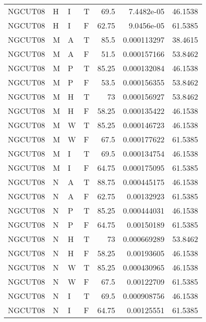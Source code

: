 \begin{longtable}{llllrrr}
    NGCUT08  & H     & I     & T          & 69.5       & 7.4482e-05  & 46.1538  \\
    NGCUT08  & H     & I     & F          & 62.75      & 9.0456e-05  & 61.5385  \\
    NGCUT08  & M     & A     & T          & 85.5       & 0.000113297 & 38.4615  \\
    NGCUT08  & M     & A     & F          & 51.5       & 0.000157166 & 53.8462  \\
    NGCUT08  & M     & P     & T          & 85.25      & 0.000132084 & 46.1538  \\
    NGCUT08  & M     & P     & F          & 53.5       & 0.000156355 & 53.8462  \\
    NGCUT08  & M     & H     & T          & 73         & 0.000156927 & 53.8462  \\
    NGCUT08  & M     & H     & F          & 58.25      & 0.000135422 & 46.1538  \\
    NGCUT08  & M     & W     & T          & 85.25      & 0.000146723 & 46.1538  \\
    NGCUT08  & M     & W     & F          & 67.5       & 0.000177622 & 61.5385  \\
    NGCUT08  & M     & I     & T          & 69.5       & 0.000134754 & 46.1538  \\
    NGCUT08  & M     & I     & F          & 64.75      & 0.000175095 & 61.5385  \\
    NGCUT08  & N     & A     & T          & 88.75      & 0.000445175 & 46.1538  \\
    NGCUT08  & N     & A     & F          & 62.75      & 0.00132923  & 61.5385  \\
    NGCUT08  & N     & P     & T          & 85.25      & 0.000444031 & 46.1538  \\
    NGCUT08  & N     & P     & F          & 64.75      & 0.00150189  & 61.5385  \\
    NGCUT08  & N     & H     & T          & 73         & 0.000669289 & 53.8462  \\
    NGCUT08  & N     & H     & F          & 58.25      & 0.00193605  & 46.1538  \\
    NGCUT08  & N     & W     & T          & 85.25      & 0.000430965 & 46.1538  \\
    NGCUT08  & N     & W     & F          & 67.5       & 0.00122709  & 61.5385  \\
    NGCUT08  & N     & I     & T          & 69.5       & 0.000908756 & 46.1538  \\
    NGCUT08  & N     & I     & F          & 64.75      & 0.00125551  & 61.5385  \\

\end{longtable}
